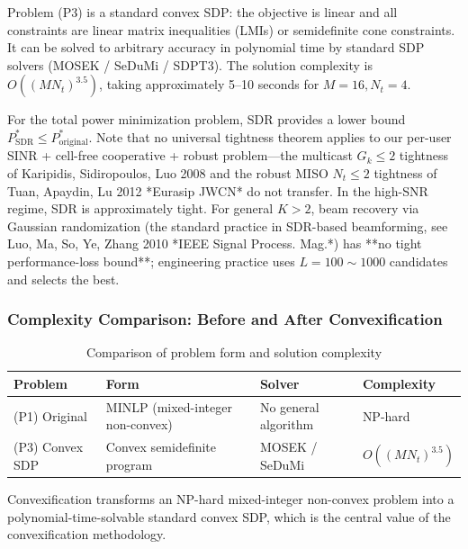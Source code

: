 \begin{theorem}\label{thm:convex_p3}
Problem (P3) is a standard convex SDP: the objective is linear and all constraints are linear matrix inequalities (LMIs) or semidefinite cone constraints. It can be solved to arbitrary accuracy in polynomial time by standard SDP solvers (MOSEK / SeDuMi / SDPT3). The solution complexity is $O((MN_t)^{3.5})$, taking approximately 5--10 seconds for $M=16, N_t=4$.
\end{theorem}

\begin{theorem}\label{thm:sdr_tight}
For the total power minimization problem, SDR provides a lower bound $P_{\text{SDR}}^* \leq P_{\text{original}}^*$. Note that no universal tightness theorem applies to our per-user SINR + cell-free cooperative + robust problem—the multicast $G_k \leq 2$ tightness of Karipidis, Sidiropoulos, Luo 2008 and the robust MISO $N_t \leq 2$ tightness of Tuan, Apaydin, Lu 2012 *Eurasip JWCN* do not transfer. In the high-SNR regime, SDR is approximately tight. For general $K>2$, beam recovery via Gaussian randomization (the standard practice in SDR-based beamforming, see Luo, Ma, So, Ye, Zhang 2010 *IEEE Signal Process. Mag.*) has **no tight performance-loss bound**; engineering practice uses $L = 100 \sim 1000$ candidates and selects the best.
\end{theorem}

\subsubsection{Complexity Comparison: Before and After Convexification}

\begin{table}[htbp]
\centering
\caption{Comparison of problem form and solution complexity}\label{tab:complexity_compare}
\begin{tabular}{llll}
\toprule
Problem & Form & Solver & Complexity \\
\midrule
(P1) Original & MINLP (mixed-integer non-convex) & No general algorithm & NP-hard \\
(P3) Convex SDP & Convex semidefinite program & MOSEK / SeDuMi & $O((MN_t)^{3.5})$ \\
\bottomrule
\end{tabular}
\end{table}

Convexification transforms an NP-hard mixed-integer non-convex problem into a polynomial-time-solvable standard convex SDP, which is the central value of the convexification methodology.
